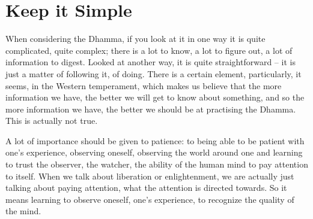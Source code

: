 
\chapter{Keep it Simple}
\markright{\theChapterAuthor}

When considering the Dhamma, if you look at it in one way it is quite
complicated, quite complex; there is a lot to know, a lot to figure out, 
a lot of information to digest. Looked at another way, it is quite
straightforward -- it is just a matter of following it, of doing. There
is a certain element, particularly, it seems, in the Western
temperament, which makes us believe that the more information we have, 
the better we will get to know about something, and so the more
information we have, the better we should be at practising the Dhamma. 
This is actually not true. 

A lot of importance should be given to patience: to being able to be
patient with one's experience, observing oneself, observing the world
around one and learning to trust the observer, the watcher, the ability
of the human mind to pay attention to itself. When we talk about
liberation or enlightenment, we are actually just talking about paying
attention, what the attention is directed towards. So it means learning
to observe oneself, one's experience, to recognize the quality of the
mind. 

